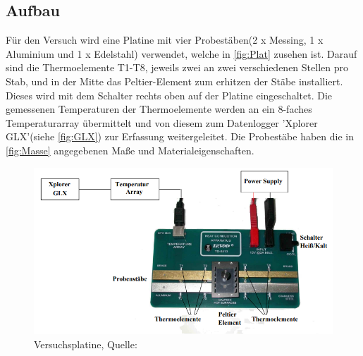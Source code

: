 \subsection{Aufbau}
\label{subsec:Aufbau}
Für den Versuch wird eine Platine mit vier Probestäben(2 x Messing, 1 x Aluminium und 1 x Edelstahl)
verwendet, welche in \autoref{fig:Plat} zusehen ist. Darauf sind die Thermoelemente T1-T8, jeweils zwei
an zwei verschiedenen Stellen pro Stab, und in der Mitte das Peltier-Element zum erhitzen der Stäbe installiert.
Dieses wird mit dem Schalter rechts oben auf der Platine eingeschaltet. Die gemessenen Temperaturen der Thermoelemente werden an ein 8-faches Temperaturarray
übermittelt und von diesem zum Datenlogger 'Xplorer GLX'(siehe \autoref{fig:GLX}) zur Erfassung weitergeleitet. Die Probestäbe haben die in \autoref{fig:Masse} angegebenen Maße und Materialeigenschaften.
\begin{figure}[H]
    \centering
    \includegraphics[scale=0.8]{content/Aufbau.png}
    \caption{Versuchsplatine, Quelle:\cite{sample}}
    \label{fig:Plat}
\end{figure}
